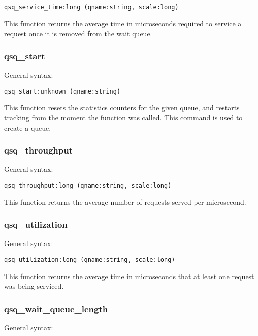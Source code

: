 \documentclass[twoside,english]{article}
\newenvironment{vindent}
{\begin{list}{}{\setlength{\listparindent}{6pt}}
\item[]}
{\end{list}}
\begin{document}
\begin{vindent}
\begin{verbatim}
qsq_service_time:long (qname:string, scale:long)
\end{verbatim}
\end{vindent}
This function returns the average time in microseconds required to service
a request once it is removed from the wait queue.


\subsubsection{qsq\_start}
General syntax:

\begin{vindent}
\begin{verbatim}
qsq_start:unknown (qname:string)
\end{verbatim}
\end{vindent}
This function resets the statistics counters for the given queue, and restarts
tracking from the moment the function was called. This command is used to
create a queue.


\subsubsection{qsq\_throughput}
General syntax:

\begin{vindent}
\begin{verbatim}
qsq_throughput:long (qname:string, scale:long)
\end{verbatim}
\end{vindent}
This function returns the average number of requests served per microsecond.


\subsubsection{qsq\_utilization}
General syntax:

\begin{vindent}
\begin{verbatim}
qsq_utilization:long (qname:string, scale:long)
\end{verbatim}
\end{vindent}
This function returns the average time in microseconds that at least one
request was being serviced.


\subsubsection{qsq\_wait\_queue\_length}
General syntax:
\end{document}
